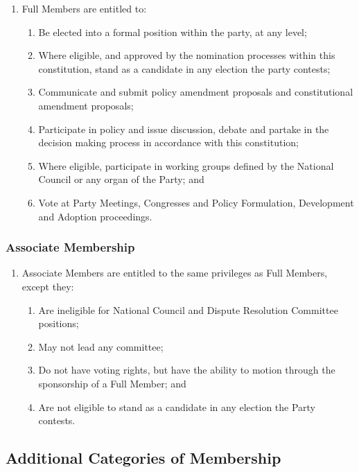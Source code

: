 \documentclass[a4paper,titlepage,8.5pt]{article}
\begin{document}
\begin{enumerate}
\item Full Members are entitled to:
\begin{enumerate}
\item Be elected into a formal position within the party, at any level;
\item Where eligible, and approved by the nomination processes within this constitution, stand as a candidate in any election the party contests;
\item Communicate and submit policy amendment proposals and constitutional amendment proposals;
\item Participate in policy and issue discussion, debate and partake in the decision making process in accordance with this constitution;
\item Where eligible, participate in working groups defined by the National Council or any organ of the Party; and
\item Vote at Party Meetings, Congresses and Policy Formulation, Development and Adoption proceedings.
\end{enumerate}
\end{enumerate}

\subsubsection{Associate Membership}

\begin{enumerate}
\item Associate Members are entitled to the same privileges as Full Members, except they:
\begin{enumerate}
\item Are ineligible for National Council and Dispute Resolution Committee positions;
\item May not lead any committee;
\item Do not have voting rights, but have the ability to motion through the sponsorship of a Full Member; and
\item Are not eligible to stand as a candidate in any election the Party contests.
\end{enumerate}
\end{enumerate}

\subsection{Additional Categories of Membership}
\end{document}
